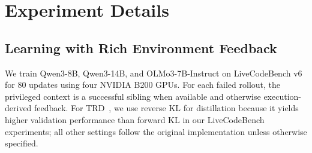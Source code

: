 \section{Experiment Details}
\label{app:hyperparameters}
























\setlength{\tabcolsep}{3.2pt}



























































\subsection{Learning with Rich Environment Feedback}
\label{app:lcb-hparams}

We train Qwen3-8B, Qwen3-14B, and OLMo3-7B-Instruct on LiveCodeBench v6 for 80 updates using four NVIDIA B200 GPUs. For each failed rollout, the privileged context is a successful sibling when available and otherwise execution-derived feedback. For TRD~\citep{jiang2026trajectory}, we use reverse KL for distillation because it yields higher validation performance than forward KL in our LiveCodeBench experiments; all other settings follow the original implementation unless otherwise specified.



